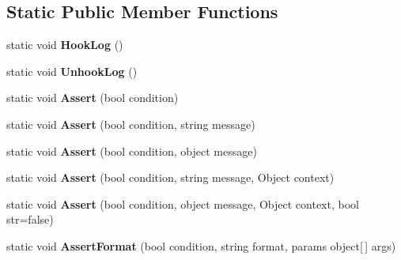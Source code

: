 \subsection*{Static Public Member Functions}
\begin{DoxyCompactItemize}
\item 
\mbox{\label{class_lerp2_a_p_i_1_1_debug_handler_1_1_debug_ac2d5c7449be35d3dff4030306f25aa2f}} 
static void {\bfseries Hook\+Log} ()
\item 
\mbox{\label{class_lerp2_a_p_i_1_1_debug_handler_1_1_debug_a7399084a2479a650ef89b001fe151043}} 
static void {\bfseries Unhook\+Log} ()
\item 
\mbox{\label{class_lerp2_a_p_i_1_1_debug_handler_1_1_debug_a4859fe3fe4cea6249ff19a430e7f891a}} 
static void {\bfseries Assert} (bool condition)
\item 
\mbox{\label{class_lerp2_a_p_i_1_1_debug_handler_1_1_debug_adec95d5ffec97b1da55349f6eaf4aa77}} 
static void {\bfseries Assert} (bool condition, string message)
\item 
\mbox{\label{class_lerp2_a_p_i_1_1_debug_handler_1_1_debug_aad2d5bfa861b54074b82fd1e89d0dc02}} 
static void {\bfseries Assert} (bool condition, object message)
\item 
\mbox{\label{class_lerp2_a_p_i_1_1_debug_handler_1_1_debug_a52ee851254835791cd85e6aa98e59b8a}} 
static void {\bfseries Assert} (bool condition, string message, Object context)
\item 
\mbox{\label{class_lerp2_a_p_i_1_1_debug_handler_1_1_debug_aef9d72293e9dae037998318c4fa84442}} 
static void {\bfseries Assert} (bool condition, object message, Object context, bool str=false)
\item 
\mbox{\label{class_lerp2_a_p_i_1_1_debug_handler_1_1_debug_a5741aeeeee3a8380624e84357c6b9719}} 
static void {\bfseries Assert\+Format} (bool condition, string format, params object\mbox{[}$\,$\mbox{]} args)

\end{DoxyCompactItemize}
